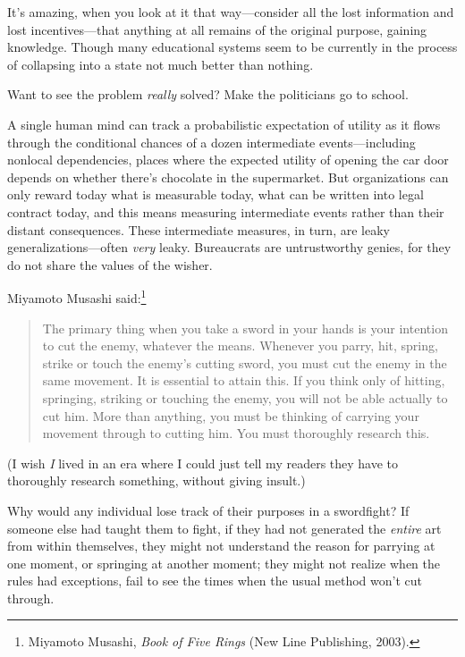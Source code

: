 {{{
 It's amazing, when you look at it that
way---consider all the lost information and lost incentives---that
anything at all remains of the original purpose, gaining knowledge.
Though many educational systems seem to be currently in the process of
collapsing into a state not much better than nothing.}

{
 Want to see the problem \textit{really} solved? Make the
politicians go to school.}

{
 A single human mind can track a probabilistic expectation of
utility as it flows through the conditional chances of a dozen
intermediate events---including nonlocal dependencies, places where the
expected utility of opening the car door depends on whether
there's chocolate in the supermarket. But organizations
can only reward today what is measurable today, what can be written
into legal contract today, and this means measuring intermediate events
rather than their distant consequences. These intermediate measures, in
turn, are leaky generalizations---often \textit{very} leaky.
Bureaucrats are untrustworthy genies, for they do not share the values
of the wisher.}

{
 Miyamoto Musashi said:\footnote{Miyamoto Musashi, \textit{Book of Five Rings} (New Line
Publishing, 2003).}}

\begin{quote}
{
 The primary thing when you take a sword in your hands is your
intention to cut the enemy, whatever the means. Whenever you parry,
hit, spring, strike or touch the enemy's cutting sword,
you must cut the enemy in the same movement. It is essential to attain
this. If you think only of hitting, springing, striking or touching the
enemy, you will not be able actually to cut him. More than anything,
you must be thinking of carrying your movement through to cutting him.
You must thoroughly research this.}
\end{quote}

{
 (I wish \textit{I} lived in an era where I could just tell my
readers they have to thoroughly research something, without giving
insult.)}

{
 Why would any individual lose track of their purposes in a
swordfight? If someone else had taught them to fight, if they had not
generated the \textit{entire} art from within themselves, they might
not understand the reason for parrying at one moment, or springing at
another moment; they might not realize when the rules had exceptions,
fail to see the times when the usual method won't cut
through.}

}}
